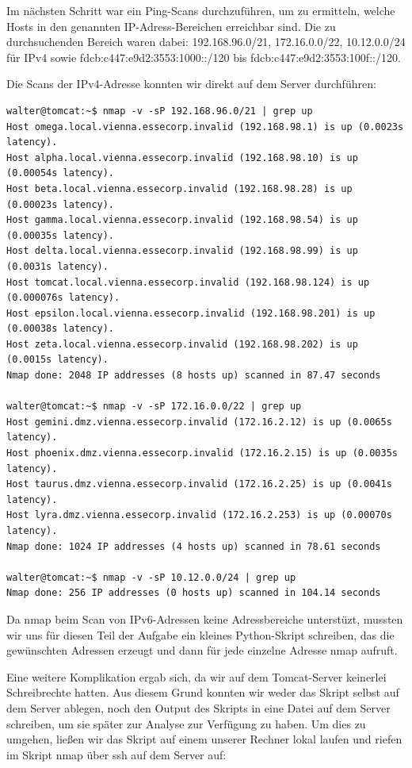 Im nächsten Schritt war ein Ping-Scans durchzuführen, um zu ermitteln, welche Hosts in den genannten IP-Adress-Bereichen erreichbar sind. Die zu durchsuchenden Bereich waren dabei: 192.168.96.0/21, 172.16.0.0/22, 10.12.0.0/24 für IPv4 sowie fdcb:c447:e9d2:3553:1000::/120 bis fdcb:c447:e9d2:3553:100f::/120.

Die Scans der IPv4-Adresse konnten wir direkt auf dem Server durchführen:

\begin{lstlisting}
walter@tomcat:~$ nmap -v -sP 192.168.96.0/21 | grep up
Host omega.local.vienna.essecorp.invalid (192.168.98.1) is up (0.0023s latency).
Host alpha.local.vienna.essecorp.invalid (192.168.98.10) is up (0.00054s latency).
Host beta.local.vienna.essecorp.invalid (192.168.98.28) is up (0.00023s latency).
Host gamma.local.vienna.essecorp.invalid (192.168.98.54) is up (0.00035s latency).
Host delta.local.vienna.essecorp.invalid (192.168.98.99) is up (0.0031s latency).
Host tomcat.local.vienna.essecorp.invalid (192.168.98.124) is up (0.000076s latency).
Host epsilon.local.vienna.essecorp.invalid (192.168.98.201) is up (0.00038s latency).
Host zeta.local.vienna.essecorp.invalid (192.168.98.202) is up (0.0015s latency).
Nmap done: 2048 IP addresses (8 hosts up) scanned in 87.47 seconds

walter@tomcat:~$ nmap -v -sP 172.16.0.0/22 | grep up
Host gemini.dmz.vienna.essecorp.invalid (172.16.2.12) is up (0.0065s latency).
Host phoenix.dmz.vienna.essecorp.invalid (172.16.2.15) is up (0.0035s latency).
Host taurus.dmz.vienna.essecorp.invalid (172.16.2.25) is up (0.0041s latency).
Host lyra.dmz.vienna.essecorp.invalid (172.16.2.253) is up (0.00070s latency).
Nmap done: 1024 IP addresses (4 hosts up) scanned in 78.61 seconds

walter@tomcat:~$ nmap -v -sP 10.12.0.0/24 | grep up
Nmap done: 256 IP addresses (0 hosts up) scanned in 104.14 seconds
\end{lstlisting}

Da nmap beim Scan von IPv6-Adressen keine Adressbereiche unterstüzt, mussten wir uns für diesen Teil der Aufgabe ein kleines Python-Skript schreiben, das die gewünschten Adressen erzeugt und dann für jede einzelne Adresse nmap aufruft.

Eine weitere Komplikation ergab sich, da wir auf dem Tomcat-Server keinerlei Schreibrechte hatten. Aus diesem Grund konnten wir weder das Skript selbst auf dem Server ablegen, noch den Output des Skripts in eine Datei auf dem Server schreiben, um sie später zur Analyse zur Verfügung zu haben. Um dies zu umgehen, ließen wir das Skript auf einem unserer Rechner lokal laufen und riefen im Skript nmap über ssh auf dem Server auf:

